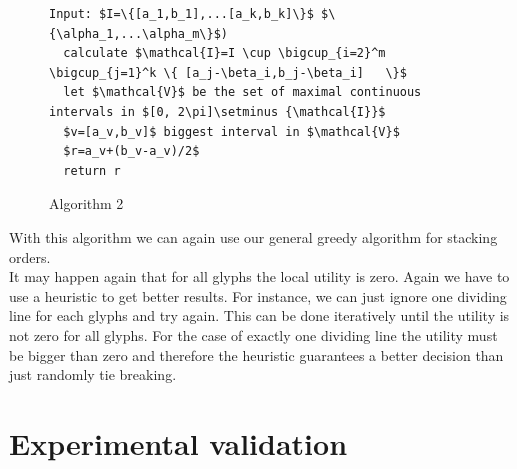 \documentclass[a4paper,11pt]{article}
\begin{document}
\begin{figure}[!bth]
  \begin{lstlisting}[mathescape=true ]
Input: $I=\{[a_1,b_1],...[a_k,b_k]\}$ $\{\alpha_1,...\alpha_m\}$)
  calculate $\mathcal{I}=I \cup \bigcup_{i=2}^m    \bigcup_{j=1}^k \{ [a_j-\beta_i,b_j-\beta_i]   \}$
  let $\mathcal{V}$ be the set of maximal continuous intervals in $[0, 2\pi]\setminus {\mathcal{I}}$
  $v=[a_v,b_v]$ biggest interval in $\mathcal{V}$
  $r=a_v+(b_v-a_v)/2$
  return r
  \end{lstlisting}
  \caption{Algorithm 2}
\end{figure}

With this algorithm we can again use our general greedy algorithm for stacking orders.\\

It may happen again that for all glyphs the local utility is zero. Again we have to use a heuristic to get better results. For instance, we can just ignore one dividing line for each glyphs and try again. This can be done iteratively until the utility is not zero for all glyphs. For the case of exactly one dividing line the utility must be bigger than zero and therefore the heuristic guarantees a better decision than just randomly tie breaking.

\newpage

\section{Experimental validation}

\end{document}
